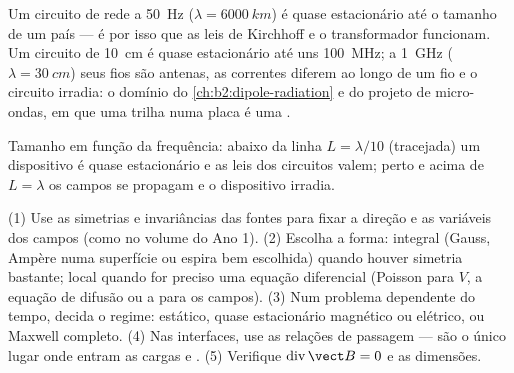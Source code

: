\begin{example}\label{ex:b2:maxwell-equations:sizes}
Um circuito de rede a \qty{50}{Hz} ($\lambda = \qty{6000}{km}$) é quase estacionário
até o tamanho de um país --- é por isso que as leis de Kirchhoff e o
transformador funcionam. Um circuito de \qty{10}{cm} é quase estacionário até uns
\qty{100}{MHz}; a \qty{1}{GHz} ($\lambda = \qty{30}{cm}$) seus fios são antenas,
as correntes diferem ao longo de um fio e o circuito irradia: o domínio do
\cref{ch:b2:dipole-radiation} e do projeto de micro-ondas, em que uma trilha numa
placa é uma .
\end{example}

\begin{omfigure}

{\small Tamanho em função da frequência: abaixo da linha $L = \lambda/10$ (tracejada) um
dispositivo é quase estacionário e as leis dos circuitos valem; perto e acima de
$L = \lambda$ os campos se propagam e o dispositivo irradia.}
\end{omfigure}

\begin{method}\label{met:b2:maxwell-equations:method}
(1) Use as simetrias e invariâncias das fontes para fixar a
direção e as variáveis dos campos (como no volume do Ano 1).
(2) Escolha a forma: integral (Gauss, Ampère numa superfície ou espira
bem escolhida) quando houver simetria bastante; local quando for preciso uma
equação diferencial (Poisson para $V$, a equação de difusão ou a 
para os campos). (3) Num problema dependente do tempo, decida o regime:
estático, quase estacionário magnético ou elétrico, ou Maxwell completo. (4)
Nas interfaces, use as relações de passagem --- são o único lugar
onde entram as cargas e . (5) Verifique
$\operatorname{div}\vect B = 0$ e as dimensões.
\end{method}

